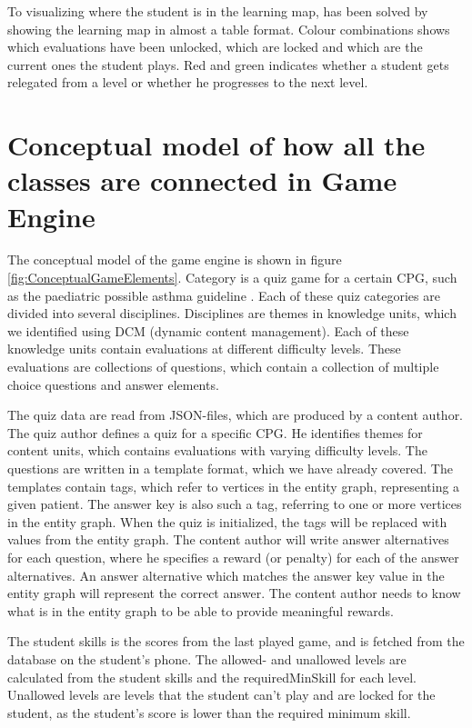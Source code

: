 To visualizing where the student is in the learning map, has been solved by showing the learning map in almost a table format. Colour combinations shows which evaluations have been unlocked, which are locked and which are the current ones the student plays. Red and green indicates whether a student gets relegated from a level or whether he progresses to the next level.


\section{Conceptual model of how all the classes are connected in Game Engine}
The conceptual model of the game engine is shown in figure \ref{fig:ConceptualGameElements}. Category is a quiz game for a certain CPG, such as the paediatric possible asthma guideline \parencite{RepublicofKeny2016}. Each of these quiz categories are divided into several disciplines. Disciplines are themes in knowledge units, which we identified using DCM (dynamic content management). Each of these knowledge units contain evaluations at different difficulty levels. These evaluations are collections of questions, which contain a collection of multiple choice questions and answer elements.

The quiz data are read from JSON-files, which are produced by a content author. The quiz author defines a quiz for a specific CPG. He identifies themes for content units, which contains evaluations with varying difficulty levels. The questions are written in a template format, which we have already covered. The templates contain tags, which refer to vertices in the entity graph, representing a given patient. The answer key is also such a tag, referring to one or more vertices in the entity graph. When the quiz is initialized, the tags will be replaced with values from the entity graph. The content author will write answer alternatives for each question, where he specifies a reward (or penalty) for each of the answer alternatives. An answer alternative which matches the answer key value in the entity graph will represent the correct answer. The content author needs to know what is in the entity graph to be able to provide meaningful rewards.

The student skills is the scores from the last played game, and is fetched from the database on the student's phone. The allowed- and unallowed levels are calculated from the student skills and the requiredMinSkill for each level. Unallowed levels are levels that the student can't play and are locked for the student, as the student's score is lower than the required minimum skill.

